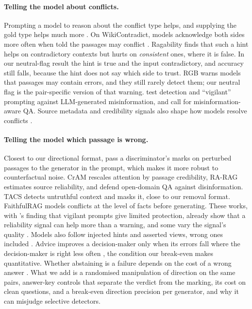 \paragraph{Telling the model about conflicts.}
Prompting a model to reason about the conflict type helps, and supplying the gold type helps much more
\citep{cattan2025conflicts}. On WikiContradict, models acknowledge both sides more often when told the passages may
conflict \citep{hou2024wikicontradict}. Ragability \citep{gross2026ragability} finds that such a hint helps on
contradictory contexts but hurts on \emph{consistent} ones, where it is false. In our neutral-flag result the hint is
true and the input contradictory, and accuracy still falls, because the hint does not say which side to trust.
RGB \citep{chen2024rgb} warns models that passages may contain errors, and they still rarely
detect them; our neutral flag is the pair-specific version of that warning.
\citet{pan2023risk} test detection and ``vigilant'' prompting against LLM-generated misinformation, and
\citet{pan2023attacking} call for misinformation-aware QA. Source metadata and credibility signals also shape how models resolve conflicts
\citep{chiang2024metadata,ge2025confact}.

\paragraph{Telling the model which passage is wrong.}
Closest to our directional format, \citet{hong2024gullible} pass a discriminator's marks on perturbed passages to the
generator in the prompt, which makes it more robust to counterfactual noise. CrAM \citep{deng2025cram} rescales
attention by passage credibility, RA-RAG \citep{hwang2025rarag} estimates source reliability, and
\citet{weller2024defending} defend open-domain QA against disinformation. TACS \citep{yu2024tacs} detects untruthful context and masks it,
close to our removal format. FaithfulRAG \citep{zhang2025faithfulrag} models
conflicts at the level of facts before generating. These works, with \citet{pan2023risk}'s finding that vigilant
prompts give limited protection, already show that a reliability signal can help more than a warning, and some vary
the signal's quality \citep{hong2024gullible,pan2024credibility}. Models also follow injected hints and asserted views, wrong
ones included \citep{turpin2023unfaithful,sharma2024sycophancy}. Advice improves a decision-maker only when its
errors fall where the decision-maker is right less often \citep{bansal2021accurate,mozannar2020defer}, the
condition our break-even makes quantitative. Whether
abstaining is a failure depends on the cost of a wrong answer \citep{wen2025abstention,song2025trustscore}.
What we add is a randomised manipulation of direction on the same pairs, answer-key controls that separate the verdict
from the marking, its cost on clean questions, and a break-even direction precision per generator,
and why it can misjudge selective detectors.

